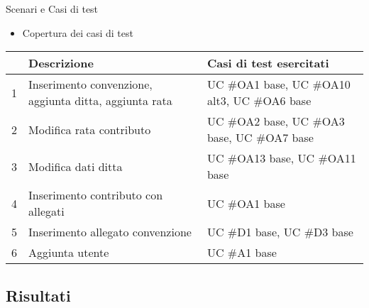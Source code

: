 \begin{frame}{Scenari e Casi di test}

\begin{itemize}
\item Copertura dei casi di test
\end{itemize}

\begin{center}
\footnotesize
\begin{tabular}{| c| p{4.5cm} | p{4.5cm} |} 
    \hline
     & Descrizione & Casi di test esercitati \\
    \hline
    1 & Inserimento convenzione,\newline
    aggiunta ditta,
    aggiunta rata & UC \#OA1 base,
    UC \#OA10 alt3,\newline
    UC \#OA6 base\\
    \hline
    2 & Modifica rata contributo & UC \#OA2 base,
    UC \#OA3 base, \newline
    UC \#OA7 base  \\
    \hline
    3 & Modifica dati ditta & UC \#OA13 base,
    UC \#OA11 base \\
    \hline
    4 & Inserimento contributo con allegati & UC \#OA1 base\\
    \hline
    5 & Inserimento allegato convenzione & UC \#D1 base,
    UC \#D3 base\\
    \hline
    6 & Aggiunta utente & UC \#A1 base\\
    \hline
  \end{tabular} 
\end{center}

\end{frame}

\subsection{Risultati}

